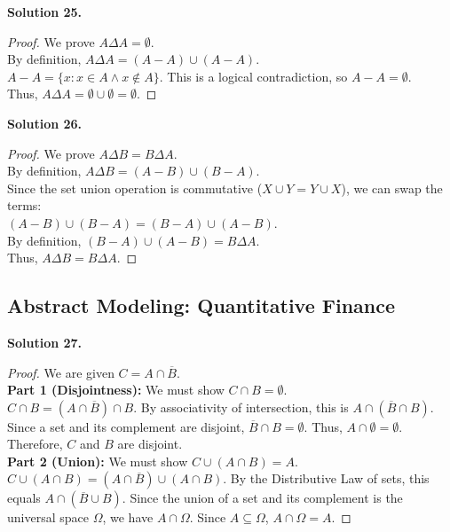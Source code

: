 \documentclass[11pt]{article}
\begin{document}
\noindent \textbf{Solution 25.}
\begin{proof}
We prove $A \Delta A = \emptyset$. \\
By definition, $A \Delta A = (A - A) \cup (A - A)$. \\
$A - A = \{x : x \in A \land x \notin A\}$. This is a logical contradiction, so $A - A = \emptyset$. \\
Thus, $A \Delta A = \emptyset \cup \emptyset = \emptyset$.
\end{proof}

\noindent \textbf{Solution 26.}
\begin{proof}
We prove $A \Delta B = B \Delta A$. \\
By definition, $A \Delta B = (A - B) \cup (B - A)$. \\
Since the set union operation is commutative ($X \cup Y = Y \cup X$), we can swap the terms: \\
$(A - B) \cup (B - A) = (B - A) \cup (A - B)$. \\
By definition, $(B - A) \cup (A - B) = B \Delta A$. \\
Thus, $A \Delta B = B \Delta A$.
\end{proof}

\subsection{Abstract Modeling: Quantitative Finance}

\noindent \textbf{Solution 27.}
\begin{proof}
We are given $C = A \cap \overline{B}$. \\
\textbf{Part 1 (Disjointness):} We must show $C \cap B = \emptyset$. \\
$C \cap B = (A \cap \overline{B}) \cap B$. By associativity of intersection, this is $A \cap (\overline{B} \cap B)$. Since a set and its complement are disjoint, $\overline{B} \cap B = \emptyset$. Thus, $A \cap \emptyset = \emptyset$. Therefore, $C$ and $B$ are disjoint. \\
\textbf{Part 2 (Union):} We must show $C \cup (A \cap B) = A$. \\
$C \cup (A \cap B) = (A \cap \overline{B}) \cup (A \cap B)$. By the Distributive Law of sets, this equals $A \cap (\overline{B} \cup B)$. Since the union of a set and its complement is the universal space $\Omega$, we have $A \cap \Omega$. Since $A \subseteq \Omega$, $A \cap \Omega = A$.
\end{proof}
\end{document}
